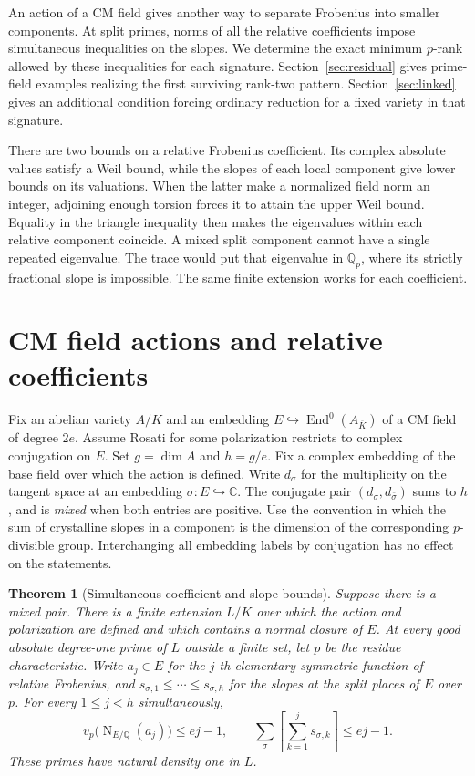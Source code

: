 \documentclass[11pt]{article}
\newtheorem{theorem}{Theorem}
\theoremstyle{definition}
\DeclareMathOperator{\Nm}{N}
\newcommand{\Q}{\mathbb Q}
\begin{document}
An action of a CM field gives another way to separate Frobenius into
smaller components. At split primes, norms of all the relative
coefficients impose simultaneous inequalities on the slopes. We
determine the exact minimum \(p\)-rank allowed by these inequalities
for each signature. Section~\ref{sec:residual} gives prime-field
examples realizing the first surviving rank-two pattern.
Section~\ref{sec:linked} gives an additional condition forcing
ordinary reduction for a fixed variety in that signature.

There are two bounds on a relative Frobenius coefficient. Its complex
absolute values satisfy a Weil bound, while the slopes of each local
component give lower bounds on its valuations. When the latter make a
normalized field norm an integer, adjoining enough torsion forces it
to attain the upper Weil bound. Equality in the triangle inequality
then makes the eigenvalues within each relative component coincide.
A mixed split component cannot have a single repeated eigenvalue.
The trace would put that eigenvalue in \(\Q_p\), where its strictly
fractional slope is impossible. The same finite extension works for
each coefficient.




\section{CM field actions and relative coefficients}\label{sec:coefficients}

Fix an abelian variety \(A/K\) and an embedding
\(E\hookrightarrow\operatorname{End}^0(A_{\overline K})\) of a CM
field of degree \(2e\). Assume Rosati for some polarization restricts
to complex conjugation on \(E\). Set \(g=\dim A\) and \(h=g/e\).
Fix a complex embedding of the base field over which the action is
defined. Write \(d_\sigma\) for the multiplicity on the tangent space
at an embedding \(\sigma:E\hookrightarrow\mathbb C\). The conjugate
pair \((d_\sigma,d_{\bar\sigma})\) sums to \(h\), and is
\emph{mixed} when both entries are positive. Use the convention in
which the sum of crystalline slopes in a component is the dimension
of the corresponding \(p\)-divisible group. Interchanging all
embedding labels by conjugation has no effect on the statements.

\begin{samepage}
\begin{theorem}[Simultaneous coefficient and slope bounds]\label{thm:bounds}
Suppose there is a mixed pair. There is a finite extension \(L/K\) over
which the action and polarization are defined and which contains a
normal closure of \(E\). At every good absolute degree-one prime of
\(L\) outside a finite set, let \(p\) be the residue characteristic.
Write \(a_j\in E\) for the \(j\)-th elementary symmetric function of
relative Frobenius, and \(s_{\sigma,1}\le\cdots\le s_{\sigma,h}\) for
the slopes at the split places of \(E\) over \(p\). For every
\(1\le j<h\) simultaneously,
\[
 v_p\bigl(\Nm_{E/\Q}(a_j)\bigr)\le ej-1,\qquad
 \sum_\sigma\left\lceil\sum_{k=1}^j s_{\sigma,k}\right\rceil
 \le ej-1 .
\]
These primes have natural density one in \(L\).
\end{theorem}
\end{samepage}
\end{document}
